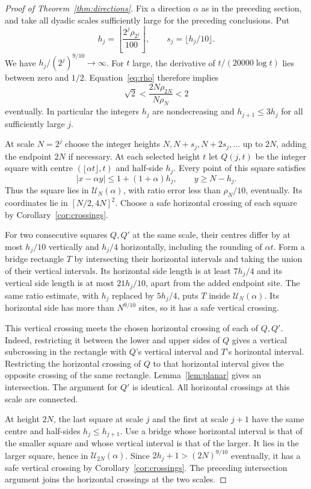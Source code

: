 \documentclass[11pt]{article}
\theoremstyle{definition}
\theoremstyle{remark}
\begin{document}
\begin{proof}[Proof of Theorem~\ref{thm:directions}]
Fix a direction $\alpha$ as in the preceding section, and take all dyadic
scales sufficiently large for the preceding conclusions. Put
\[
 h_j=\left\lfloor\frac{2^j\rho_{2^j}}{100}\right\rfloor,\qquad
 s_j=\lfloor h_j/10\rfloor.
\]
We have $h_j/(2^j)^{9/10}\to\infty$.
For $t$ large, the derivative of $t/(20000\log t)$ lies between zero
and $1/2$. Equation~\eqref{eq:rho} therefore implies
\[
 \sqrt2<\frac{2N\rho_{2N}}{N\rho_N}<2
\]
eventually. In particular the integers $h_j$ are nondecreasing and
$h_{j+1}\leq3h_j$ for all sufficiently large $j$.

At scale $N=2^j$ choose the integer heights $N,N+s_j,N+2s_j,\ldots$
up to $2N$, adding the endpoint $2N$ if necessary. At each selected height
$t$ let $Q(j,t)$ be the integer square with centre
$(\lfloor\alpha t\rfloor,t)$ and half-side $h_j$.
Every point of this square satisfies
\[
 |x-\alpha y|\leq1+(1+\alpha)h_j,\qquad y\geq N-h_j.
\]
Thus the square lies in $\mathcal U_N(\alpha)$, with ratio error less
than $\rho_N/10$, eventually. Its coordinates lie in $[N/2,4N]^2$.
Choose a safe horizontal crossing of each square by
Corollary~\ref{cor:crossings}.

For two consecutive squares $Q,Q'$ at the same scale, their centres
differ by at most $h_j/10$ vertically and $h_j/4$ horizontally, including
the rounding of $\alpha t$. Form a bridge rectangle $T$ by intersecting
their horizontal intervals and taking the union of their vertical intervals.
Its horizontal side length is at least $7h_j/4$ and its vertical side
length is at most $21h_j/10$, apart from the added endpoint site.
The same ratio estimate, with $h_j$ replaced by $5h_j/4$, puts $T$
inside $\mathcal U_N(\alpha)$. Its horizontal side has more than
$N^{9/10}$ sites, so it has a safe vertical crossing.

This vertical crossing meets the chosen horizontal crossing of each of
$Q,Q'$. Indeed, restricting it between the lower and upper sides of $Q$
gives a vertical subcrossing in the rectangle with $Q$'s vertical interval
and $T$'s horizontal interval. Restricting the horizontal crossing of $Q$
to that horizontal interval gives the opposite crossing of the same
rectangle. Lemma~\ref{lem:planar} gives an intersection. The argument
for $Q'$ is identical. All horizontal crossings at this scale are connected.

At height $2N$, the last square at scale $j$ and the first at scale $j+1$
have the same centre and half-sides $h_j\leq h_{j+1}$.
Use a bridge whose horizontal interval is that of the smaller square and
whose vertical interval is that of the larger. It lies in the larger square,
hence in $\mathcal U_{2N}(\alpha)$. Since
$2h_j+1>(2N)^{9/10}$ eventually, it has a safe vertical crossing by
Corollary~\ref{cor:crossings}. The preceding intersection argument joins
the horizontal crossings at the two scales.


\end{proof}
\end{document}
